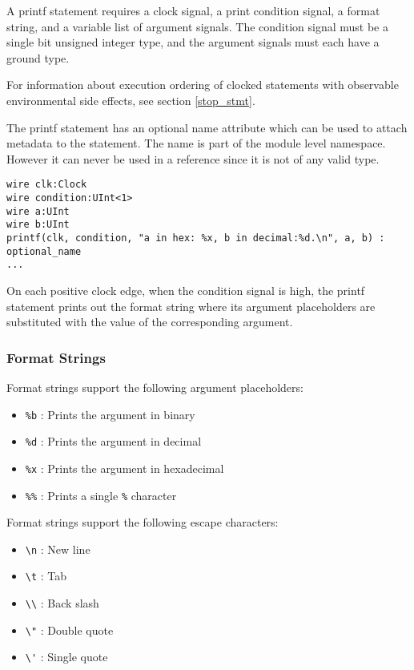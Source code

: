 \documentclass[12pt]{article}
\begin{document}
A printf statement requires a clock signal, a print condition signal, a format string, and a variable list of argument signals. The condition signal must be a single bit unsigned integer type, and the argument signals must each have a ground type.

For information about execution ordering of clocked statements with observable environmental side
effects, see section \ref{stop_stmt}.

The printf statement has an optional name attribute which can be used to
attach metadata to the statement. The name is part of the module level
namespace. However it can never be used in a reference since it is not of
any valid type.

\begin{lstlisting}
wire clk:Clock
wire condition:UInt<1>
wire a:UInt
wire b:UInt
printf(clk, condition, "a in hex: %x, b in decimal:%d.\n", a, b) : optional_name
...
\end{lstlisting}

On each positive clock edge, when the condition signal is high, the printf statement prints out the format string where its argument placeholders are substituted with the value of the corresponding argument.

\subsubsection{Format Strings}

Format strings support the following argument placeholders:
\begin{itemize}
\item \verb|%b| : Prints the argument in binary
\item \verb|%d| : Prints the argument in decimal
\item \verb|%x| : Prints the argument in hexadecimal
\item \verb|%%| : Prints a single \verb|%| character
\end{itemize}

Format strings support the following escape characters:
\begin{itemize}
\item \verb|\n| : New line
\item \verb|\t| : Tab
\item \verb|\\| : Back slash
\item \verb|\"| : Double quote
\item \verb|\'| : Single quote
\end{itemize}
\end{document}
